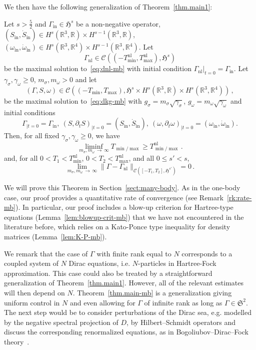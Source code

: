 \documentclass[AHL,Unicode,longabstracts,published]{cedram}
\newcommand{\rmin}{\mathrm{in}}
\newcommand{\nl}{\mathrm{nl}}
\newcommand{\cC}{\mathcal{C}}
\newcommand\R{\mathbb{R}}
\newcommand{\gS}{\mathfrak{S}}
\newcommand{\gH}{\mathfrak{H}}
\begin{document}
We then have the following generalization of Theorem~\ref{thm.main1}:

\begin{theo}\label{thm.main-mb}
Let $s>\tfrac52$ and $\Gamma_\rmin\in \gH^s$ be a non-negative operator, $(S_\rmin,\dot{S}_\rmin)\in H^s(\R^3, \R)\times H^{s-1}(\R^3, \R)$, $(\omega_\rmin,\dot{\omega}_\rmin)\in H^s(\R^3, \R^4)\times H^{s-1}(\R^3, \R^4)$. Let
\begin{equation*}
\Gamma_\nl\in\cC\left(\left(-T_{\min}^{\nl}, T_{\max}^{\nl}\right),\gH^s\right)
\end{equation*}
be the maximal solution to~\eqref{eq:dnl-mb} with initial condition $\Gamma_\nl\vert_{t=0}=\Gamma_\rmin$. Let $\gamma_\sigma, \gamma_\omega \geq 0$, $m_\sigma, m_\omega>0$ and let
\[
(\Gamma,S,\omega)\in \cC\left((-T_{\min}, T_{\max}),\gH^s\times H^s\left(\R^3,\R\right)\times H^s\left(\R^3, \R^4\right)\right)\,,
\]
be the maximal solution to~\eqref{eq:dkg-mb} with $g_\sigma=m_\sigma\sqrt{\gamma_\sigma}$, $g_\omega=m_\omega\sqrt{\gamma_\omega}$ and initial conditions
\begin{equation*}
\Gamma_{|t=0}=\Gamma_\rmin,\ (S,\partial_t S)_{|t=0}= (S_\rmin,\dot{S}_\rmin), \ (\omega,\partial_t \omega)_{|t=0}= (\omega_\rmin,\dot{\omega}_\rmin).
\end{equation*}
Then, for all fixed $\gamma_\sigma, \gamma_\omega \geq 0$, we have
\[
\liminf_{m_\sigma, m_\omega\,\to\,\infty}T_{\min/\max}\geq T_{\min/\max}^{\nl}\,.
\]
and, for all $0<T_1<T_{\min}^{\nl}$, $0<T_2<T_{\max}^{\nl}$, and all $0\leq s'<s$,
\[
\lim_{m_\sigma, m_\omega\,\to\,\infty}\|\Gamma-\Gamma_{\nl}\|_{\cC\left([-T_1, T_2],\gH^{s'}\right)}=0\,.
\]
\end{theo}

We will prove this Theorem in Section~\ref{sect:many-body}. As in the one-body case, our proof provides a quantitative rate of convergence (see Remark~\ref{rk:rate-mb}). In particular, our proof includes a blow-up criterion for Hartree-type equations (Lemma~\ref{lem:blowup-crit-mb}) that we have not encountered in the literature before, which relies on a Kato-Ponce type inequality for density matrices (Lemma~\ref{lem:K-P-mb}).

We remark that the case of $\Gamma$ with finite rank equal to $N$ corresponds to a coupled system of $N$ Dirac equations, i.e. $N$-particles in Hartree-Fock approximation. This case could also be treated by a straightforward generalization of Theorem~\ref{thm.main1}. However, all of the relevant estimates will then depend on $N$. Theorem~\ref{thm.main-mb} is a generalization giving uniform control in $N$ and even allowing for $\Gamma$ of infinite rank as long as $\Gamma \in \gS^2$. The next step would be to consider perturbations of the Dirac sea, e.g. modelled by the negative spectral projection of $D$, by Hilbert--Schmidt operators and discuss the corresponding renormalized equations, as in Bogoliubov--Dirac--Fock theory~\cite{chaix1989, GraHaiLewSer-13,hainzl2005, hainzl2007}.
\end{document}
